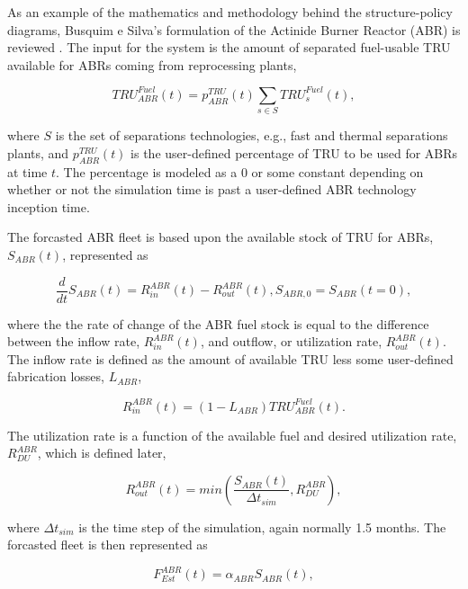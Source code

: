 As an example of the mathematics and methodology behind the structure-policy
diagrams, Busquim e Silva's formulation of the Actinide Burner Reactor (ABR) is
reviewed \cite{busquim_e_silva_system_2008}. The input for the system is the
amount of separated fuel-usable TRU available for ABRs coming from reprocessing
plants,

\begin{equation}
 TRU^{Fuel}_{ABR}(t) = p^{TRU}_{ABR}(t) \sum_{s \in S} TRU^{Fuel}_s(t),
\end{equation}

where $S$ is the set of separations technologies, e.g., fast and thermal
separations plants, and $p^{TRU}_{ABR}(t)$ is the user-defined percentage of TRU
to be used for ABRs at time $t$. The percentage is modeled as a 0 or some
constant depending on whether or not the simulation time is past a user-defined
ABR technology inception time. 

The forcasted ABR fleet is based upon the available stock of TRU for ABRs,
$S_{ABR}(t)$, represented as

\begin{equation}
 \frac{d}{dt}S_{ABR}(t) = R_{in}^{ABR}(t) - R_{out}^{ABR}(t), S_{ABR,0} = S_{ABR}(t=0),
\end{equation}

where the the rate of change of the ABR fuel stock is equal to the difference
between the inflow rate, $R_{in}^{ABR}(t)$, and outflow, or utilization rate,
$R_{out}^{ABR}(t)$. The inflow rate is defined as the amount of available TRU
less some user-defined fabrication losses, $L_{ABR}$,

\begin{equation}
 R_{in}^{ABR}(t) = \left( 1 - L_{ABR} \right) TRU^{Fuel}_{ABR}(t).
\end{equation}

The utilization rate is a function of the available fuel and desired utilization
rate, $R^{ABR}_{DU}$, which is defined later,

\begin{equation}
 R_{out}^{ABR}(t) = min \left( \frac{S_{ABR}(t)}{\Delta t_{sim}}, R^{ABR}_{DU}\right),
\end{equation}

where $\Delta t_{sim}$ is the time step of the simulation, again normally 1.5
months. The forcasted fleet is then represented as

\begin{equation}
 F_{Est}^{ABR}(t) = \alpha_{ABR} S_{ABR}(t),
\end{equation}

